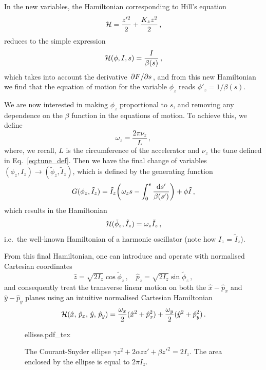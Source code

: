 In the new variables, the Hamiltonian corresponding to Hill's equation
\begin{equation} 
    \mathcal{H} = \frac{z'^2}{2} + \frac{K_z z^2}{2} \,,
\end{equation}
reduces to the simple expression
\begin{equation}
	\mathcal{H}(\phi,I,s) = \frac{I}{\beta(s)}\, ,
\end{equation}
which takes into account the derivative $\pdv*{F}{s}$, and from this new Hamiltonian we find that the equation of motion for the variable $\phi_z$ reads $\phi'_z = 1/\beta(s)$. 

We are now interested in making $\phi_z$ proportional to $s$, and removing any dependence on the $\beta$ function in the equations of motion. To achieve this, we define 
\begin{equation}
    \omega_z = \frac{2\pi\nu_z}{L} \,,
\end{equation}
where, we recall, $L$ is the circumference of the accelerator and $\nu_z$ the tune defined in Eq.~\eqref{eq:tune_def}. Then we have the final change of variables $(\phi_z,I_z)\to(\tilde\phi_z, \tilde I_z)$, which is defined by the generating function
%
\begin{equation}
	G(\phi_z,\tilde I_z) = \tilde I_z\qty(\omega_z s - \int_0^s\frac{\dd s'}{\beta(s')})+\phi\tilde I\, ,
\end{equation}
%
which results in the Hamiltonian
%
\begin{equation}
	\mathcal{H}(\tilde \phi_z,\tilde I_z) = \omega_z \tilde I_z\,,
	\label{eq:harm_ham}
 \end{equation}
%
i.e.\ the well-known Hamiltonian of a harmonic oscillator (note how $I_z$ = $\tilde{I}_z$).

From this final Hamiltonian, one can introduce and operate with normalised Cartesian coordinates 
\begin{equation}
    \hat z=\sqrt{2I_z}\cos\tilde{\phi}_z\,,\quad \hat p_z=\sqrt{2I_z}\sin\tilde{\phi}_z \,,
    \label{eq:2:cart_eq}
\end{equation}
and consequently treat the transverse linear motion on both the $\hat x-\hat p_x$ and $\hat y-\hat p_y$ planes using an intuitive normalised Cartesian Hamiltonian
%
\begin{equation}
	\mathcal{H}(\hat x,\, \hat p_x,\, \hat y,\, \hat p_y) = \frac{\omega_x}{2}(\hat x^2 +\hat p_x^2) + \frac{\omega_y}{2}(\hat y^2+\hat p_y^2)\, .
	\label{eq:linham}
\end{equation}
%

\begin{figure}
    \centering
    \def\svgwidth{0.75\columnwidth}
    {ellisse.pdf_tex}
    \caption{The Courant-Snyder ellipse $\gamma z^2 + 2\alpha zz' + \beta z'^2=2I_z$. The area enclosed by the ellipse is equal to $2\pi I_z$. }
    \label{fig:coursnyd}
\end{figure}


